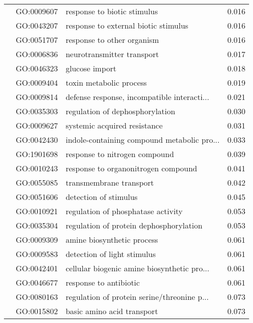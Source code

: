 \begin{longtable}{lllr}
   & GO:0009607 &                  response to biotic stimulus &         0.016 \\
   & GO:0043207 &         response to external biotic stimulus &         0.016 \\
   & GO:0051707 &                   response to other organism &         0.016 \\
   & GO:0006836 &                   neurotransmitter transport &         0.017 \\
   & GO:0046323 &                               glucose import &         0.018 \\
   & GO:0009404 &                      toxin metabolic process &         0.019 \\
   & GO:0009814 &  defense response, incompatible interacti... &         0.021 \\
   & GO:0035303 &              regulation of dephosphorylation &         0.030 \\
   & GO:0009627 &                 systemic acquired resistance &         0.031 \\
   & GO:0042430 &  indole-containing compound metabolic pro... &         0.033 \\
   & GO:1901698 &                response to nitrogen compound &         0.039 \\
   & GO:0010243 &          response to organonitrogen compound &         0.041 \\
   & GO:0055085 &                      transmembrane transport &         0.042 \\
   & GO:0051606 &                        detection of stimulus &         0.045 \\
   & GO:0010921 &           regulation of phosphatase activity &         0.053 \\
   & GO:0035304 &      regulation of protein dephosphorylation &         0.053 \\
   & GO:0009309 &                   amine biosynthetic process &         0.061 \\
   & GO:0009583 &                  detection of light stimulus &         0.061 \\
   & GO:0042401 &  cellular biogenic amine biosynthetic pro... &         0.061 \\
   & GO:0046677 &                       response to antibiotic &         0.061 \\
   & GO:0080163 &  regulation of protein serine/threonine p... &         0.073 \\
   & GO:0015802 &                   basic amino acid transport &         0.073 \\

\end{longtable}
